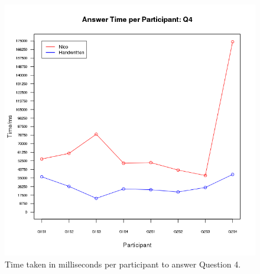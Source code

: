 \documentclass[12pt,twoside,notitlepage,xetex]{report}
\begin{document}
{\begin{center}
\begin{figure}[H]
\begin{center}
\includegraphics[height=\textheight/2-2cm]{figs/graphs/q4.png}
\end{center}
\caption{Time taken in milliseconds per participant to answer Question 4.}
\end{figure}
\end{center}

}
\end{document}
